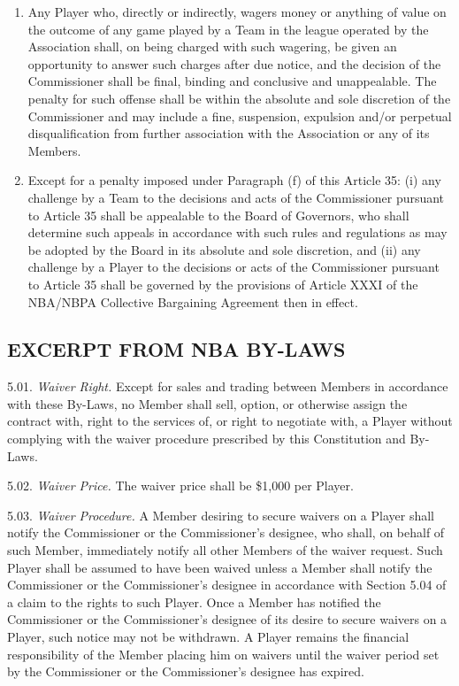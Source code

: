 \documentclass[
]{book}
\begin{document}
\begin{enumerate}
\begin{enumerate}
  \item
    Any Player who, directly or indirectly, wagers money or anything of value on the outcome of any game played by a Team in the league operated by the Association shall, on being charged with such wagering, be given an opportunity to answer such charges after due notice, and the decision of the Commissioner shall be final, binding and conclusive and unappealable. The penalty for such offense shall be within the absolute and sole discretion of the Commissioner and may include a fine, suspension, expulsion and/or perpetual disqualification from further association with the Association or any of its Members.
  \item
    Except for a penalty imposed under Paragraph (f) of this Article 35: (i) any challenge by a Team to the decisions and acts of the Commissioner pursuant to Article 35 shall be appealable to the Board of Governors, who shall determine such appeals in accordance with such rules and regulations as may be adopted by the Board in its absolute and sole discretion, and (ii) any challenge by a Player to the decisions or acts of the Commissioner pursuant to Article 35 shall be governed by the provisions of Article XXXI of the NBA/NBPA Collective Bargaining Agreement then in effect.
  \end{enumerate}
\end{enumerate}

\newpage

\hypertarget{excerpt-from-nba-by-laws}{%
\subsection{EXCERPT FROM NBA BY-LAWS}\label{excerpt-from-nba-by-laws}}

5.01. \emph{Waiver Right.} Except for sales and trading between Members in accordance with these By-Laws, no Member shall sell, option, or otherwise assign the contract with, right to the services of, or right to negotiate with, a Player without complying with the waiver procedure prescribed by this Constitution and By-Laws.

5.02. \emph{Waiver Price.} The waiver price shall be \$1,000 per Player.

5.03. \emph{Waiver Procedure.} A Member desiring to secure waivers on a Player shall notify the Commissioner or the Commissioner's designee, who shall, on behalf of such Member, immediately notify all other Members of the waiver request. Such Player shall be assumed to have been waived unless a Member shall notify the Commissioner or the Commissioner's designee in accordance with Section 5.04 of a claim to the rights to such Player. Once a Member has notified the Commissioner or the Commissioner's designee of its desire to secure waivers on a Player, such notice may not be withdrawn. A Player remains the financial responsibility of the Member placing him on waivers until the waiver period set by the Commissioner or the Commissioner's designee has expired.
\end{document}
